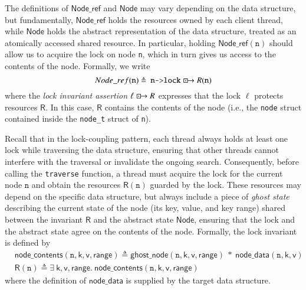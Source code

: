 \documentclass[a4paper,UKenglish,cleveref, autoref, thm-restate]{lipics-v2021}
\newcommand{\islock}{\boxdotright}
\newcommand{\lockvar}{\islock}
\newcommand{\treerep}{\ensuremath{\mathsf{Node}}}
\newcommand{\nodeboxrep}{\ensuremath{\mathsf{Node\_ref}}}
\begin{document}
The definitions of $\nodeboxrep$ and $\treerep$ may vary depending on the data structure, but fundamentally, $\nodeboxrep$ holds the resources owned by each client thread, while $\treerep$ holds the abstract representation of the data structure, treated as an atomically accessed shared resource. In particular, holding $\nodeboxrep(\texttt{n})$ should allow us to acquire the lock on node \texttt{n}, which in turn gives us access to the contents of the node. Formally, we write
\[\nodeboxrep(\texttt{n}) \triangleq\ \texttt{n->lock} \lockvar \mathsf{R}(\texttt{n})\]
where the \emph{lock invariant assertion} $\ell \lockvar \mathsf{R}$ expresses that the lock $\ell$ protects resources $\mathsf{R}$. In this case, $\mathsf{R}$ contains the contents of the node (i.e., the \lstinline{node} struct contained inside the \lstinline{node_t} struct of \lstinline{n}).

Recall that in the lock-coupling pattern, each thread always holds at least one lock while traversing the data structure, ensuring that other threads cannot interfere with the traversal or invalidate the ongoing search. Consequently, before calling the \texttt{traverse} function, a thread must acquire the lock for the current node $\texttt{n}$ and obtain the resources $\mathsf{R}(\texttt{n})$ guarded by the lock. These resources may depend on the specific data structure, but always include a piece of \emph{ghost state} describing the current state of the node (its key, value, and key range) shared between the invariant $\mathsf{R}$ and the abstract state $\treerep$, ensuring that the lock and the abstract state agree on the contents of the node. Formally, the lock invariant is defined by 
\begin{align*}
&\mathsf{node\_contents}(\texttt{n}, \mathsf{k}, \mathsf{v}, \mathsf{range}) \triangleq \mathsf{ghost\_node(\texttt{n}, k, v, range)} \ \ast \ \mathsf{node\_data}(\texttt{n}, \mathsf{k}, \mathsf{v})\\
&\mathsf{R}(\texttt{n}) \triangleq \exists\ \mathsf{k}, \mathsf{v}, \mathsf{range}.\ \mathsf{node\_contents}(\texttt{n}, \mathsf{k}, \mathsf{v}, \mathsf{range})\end{align*}
where the definition of $\mathsf{node\_data}$ is supplied by the target data structure.

\end{document}
